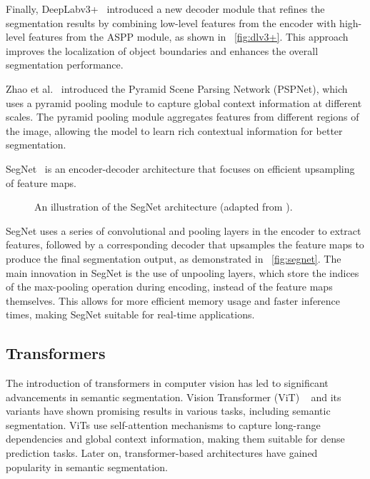 Finally, DeepLabv3+~\cite{fsss_deeplabv3plus} introduced a new decoder module that refines the segmentation results by combining low-level features from the encoder with high-level features from the ASPP module, as shown in ~\autoref{fig:dlv3+}. This approach improves the localization of object boundaries and enhances the overall segmentation performance.

Zhao et al.~\cite{fsss_pspnet} introduced the Pyramid Scene Parsing Network (PSPNet), which uses a pyramid pooling module to capture global context information at different scales. The pyramid pooling module aggregates features from different regions of the image, allowing the model to learn rich contextual information for better segmentation.

SegNet~\cite{fsss_segnet} is an encoder-decoder architecture that focuses on efficient upsampling of feature maps.
\begin{figure}[htbp]
    \centering
    \caption{An illustration of the SegNet architecture (adapted from \cite{fsss_segnet}).}
    \label{fig:segnet}
\end{figure}

SegNet uses a series of convolutional and pooling layers in the encoder to extract features, followed by a corresponding decoder that upsamples the feature maps to produce the final segmentation output, as demonstrated in ~\autoref{fig:segnet}. The main innovation in SegNet is the use of unpooling layers, which store the indices of the max-pooling operation during encoding, instead of the feature maps themselves. This allows for more efficient memory usage and faster inference times, making SegNet suitable for real-time applications.

\subsection{Transformers}
\label{subsec:transformers}
The introduction of transformers in computer vision has led to significant advancements in semantic segmentation. Vision Transformer (ViT) ~\cite{transformer_vit} and its variants have shown promising results in various tasks, including semantic segmentation. ViTs use self-attention mechanisms to capture long-range dependencies and global context information, making them suitable for dense prediction tasks. Later on, transformer-based architectures have gained popularity in semantic segmentation. 

